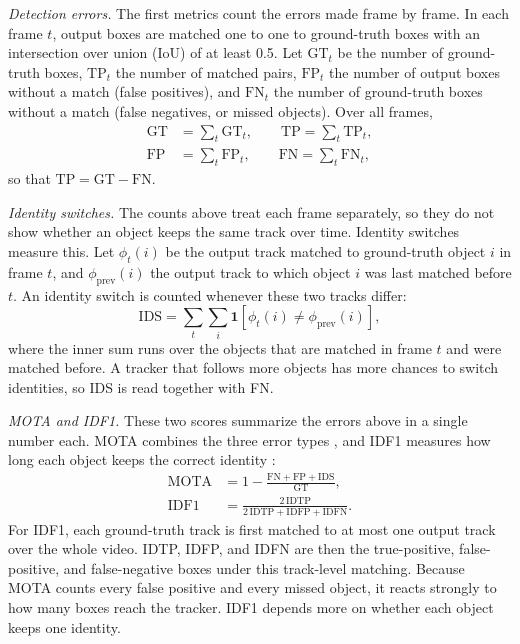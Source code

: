 \documentclass[pdflatex,sn-mathphys-num,iicol]{sn-jnl}
\begin{document}
\emph{Detection errors.} The first metrics count the errors made frame by frame. In each frame
$t$, output boxes are matched one to one to ground-truth boxes with an intersection over union
(IoU) of at least 0.5. Let $\mathrm{GT}_t$ be the number of ground-truth boxes, $\mathrm{TP}_t$ the
number of matched pairs, $\mathrm{FP}_t$ the number of output boxes without a match (false
positives), and $\mathrm{FN}_t$ the number of ground-truth boxes without a match (false negatives,
or missed objects). Over all frames,
\begin{align}
\mathrm{GT}&=\sum_t \mathrm{GT}_t,\qquad \mathrm{TP}=\sum_t \mathrm{TP}_t,\label{eq:gt}\\
\mathrm{FP}&=\sum_t \mathrm{FP}_t,\qquad \mathrm{FN}=\sum_t \mathrm{FN}_t,\label{eq:fpfn}
\end{align}
so that $\mathrm{TP}=\mathrm{GT}-\mathrm{FN}$.

\emph{Identity switches.} The counts above treat each frame separately, so they do not show
whether an object keeps the same track over time. Identity switches measure this. Let
$\phi_t(i)$ be the output track matched to ground-truth object $i$ in frame $t$, and
$\phi_{\mathrm{prev}}(i)$ the output track to which object $i$ was last matched before $t$. An
identity switch is counted whenever these two tracks differ:
\begin{equation}
\mathrm{IDS}=\sum_t\sum_{i}\mathbf{1}\!\left[\phi_t(i)\neq\phi_{\mathrm{prev}}(i)\right],
\label{eq:ids}
\end{equation}
where the inner sum runs over the objects that are matched in frame $t$ and were matched before.
A tracker that follows more objects has more chances to switch identities, so IDS is read together
with FN.

\emph{MOTA and IDF1.} These two scores summarize the errors above in a single number each. MOTA
combines the three error types \cite{bernardin2008clear}, and IDF1 measures how long each object
keeps the correct identity \cite{ristani2016idf1}:
\begin{align}
\mathrm{MOTA}&=1-\frac{\mathrm{FN}+\mathrm{FP}+\mathrm{IDS}}{\mathrm{GT}},\label{eq:mota}\\
\mathrm{IDF1}&=\frac{2\,\mathrm{IDTP}}{2\,\mathrm{IDTP}+\mathrm{IDFP}+\mathrm{IDFN}}.\label{eq:idf1}
\end{align}
For IDF1, each ground-truth track is first matched to at most one output track over the whole
video. IDTP, IDFP, and IDFN are then the true-positive, false-positive, and false-negative boxes
under this track-level matching. Because MOTA counts every false positive and every missed object,
it reacts strongly to how many boxes reach the tracker. IDF1 depends more on whether each object
keeps one identity.
\end{document}
